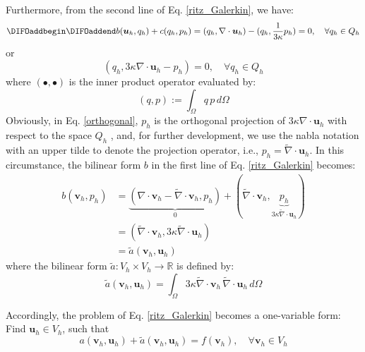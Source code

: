 Furthermore, from the second line of Eq. \eqref{ritz_Galerkin}, we have:
\begin{equation}\DIFaddbegin \label{forms_bc}
\DIFaddend b(\boldsymbol{u}_h, q_h) + c(q_h, p_h) = (q_h, \nabla \cdot \boldsymbol{u}_h) - (q_h, \frac{1}{3\kappa} p_h) = 0, \quad \forall q_h \in Q_h
\end{equation}
or
\begin{equation}\label{orthogonal}
(q_h, 3\kappa \nabla \cdot \boldsymbol{u}_h - p_h) = 0, \quad \forall q_h \in Q_h
\end{equation}
where $(\bullet, \bullet)$ is the inner product operator evaluated by:
\begin{equation}
(q, p) := \int_\Omega q \, p \, d\Omega
\end{equation}
Obviously, in Eq. \eqref{orthogonal}, $p_h$ is the orthogonal projection of $3\kappa \nabla \cdot \boldsymbol{u}_h$ with respect to the space $Q_h$ \cite{brezzi1991}, and, for further development, we use the nabla notation with an upper tilde to denote the projection operator, i.e., $p_h = \tilde{\nabla} \cdot \boldsymbol{u}_h$. In this circumstance, the bilinear form $b$ in the first line of Eq. \eqref{ritz_Galerkin} becomes:
\begin{equation}
\begin{split}
b(\boldsymbol{v}_h, p_h) &= \underbrace{(\nabla \cdot \boldsymbol{v}_h - \tilde{\nabla} \cdot \boldsymbol{v}_h, p_h)}_{0} + (\tilde{\nabla} \cdot \boldsymbol{v}_h, \underbrace{p_h}_{3\kappa \tilde \nabla \cdot \boldsymbol u_h}) \\
&= (\tilde{\nabla} \cdot \boldsymbol{v}_h, 3\kappa \tilde{\nabla} \cdot \boldsymbol{u}_h) \\
&= \tilde{a}(\boldsymbol{v}_h, \boldsymbol{u}_h)
\end{split}
\end{equation}
where the bilinear form $\tilde{a}: V_h \times V_h \rightarrow \mathbb{R}$ is defined by:
\begin{equation}
\tilde{a}(\boldsymbol{v}_h, \boldsymbol{u}_h) = \int_\Omega 3\kappa \tilde{\nabla} \cdot \boldsymbol{v}_h \, \tilde{\nabla} \cdot \boldsymbol{u}_h \, d\Omega
\end{equation}

Accordingly, the problem of Eq. \eqref{ritz_Galerkin} becomes a one-variable form:
Find $\boldsymbol{u}_h \in V_h$, such that
\begin{equation}\label{weak_penalty}
a(\boldsymbol{v}_h, \boldsymbol{u}_h) + \tilde{a}(\boldsymbol{v}_h, \boldsymbol{u}_h) = f(\boldsymbol{v}_h), \quad \forall \boldsymbol{v}_h \in V_h
\end{equation}

